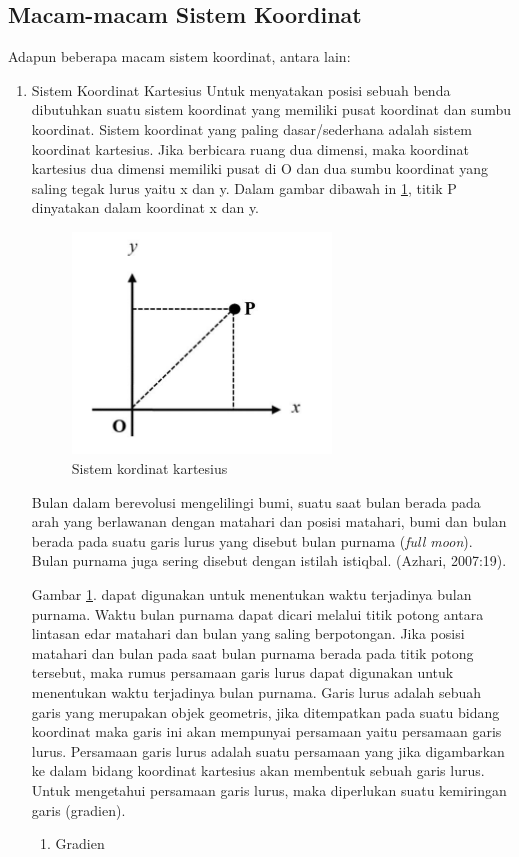 \subsection{Macam-macam Sistem Koordinat}
Adapun beberapa macam sistem koordinat, antara lain:
\begin{enumerate}
\item Sistem Koordinat Kartesius
Untuk menyatakan posisi sebuah benda dibutuhkan suatu sistem koordinat yang memiliki pusat koordinat dan sumbu koordinat. Sistem koordinat yang paling dasar/sederhana adalah sistem koordinat kartesius. Jika berbicara ruang dua dimensi, maka koordinat kartesius dua dimensi memiliki pusat di O dan dua sumbu koordinat yang saling tegak lurus yaitu x dan y. Dalam gambar dibawah in \ref{kartesius}, titik P dinyatakan dalam koordinat x dan y.
\begin{figure}[ht]
	\centerline{\includegraphics[width=0.65\textwidth]{pictures/kordinatkartesius.jpg}}
	\caption{Sistem kordinat kartesius}
	\label{kartesius}
	\end{figure}
Bulan dalam berevolusi mengelilingi bumi, suatu saat bulan berada pada arah yang berlawanan dengan matahari dan posisi matahari, bumi dan bulan berada pada suatu garis lurus yang disebut bulan purnama (\textit {full moon}). Bulan purnama juga sering disebut dengan istilah istiqbal. (Azhari, 2007:19).

Gambar \ref{kartesius}. dapat digunakan untuk menentukan waktu terjadinya bulan purnama. Waktu bulan purnama dapat dicari melalui titik potong antara lintasan edar matahari dan bulan yang saling berpotongan. Jika posisi matahari dan bulan pada saat bulan purnama berada pada titik potong tersebut, maka rumus persamaan garis lurus dapat digunakan untuk menentukan waktu terjadinya bulan purnama. Garis lurus adalah sebuah garis yang merupakan objek geometris, jika ditempatkan pada suatu bidang koordinat maka garis ini akan mempunyai  persamaan yaitu persamaan garis lurus. Persamaan garis lurus adalah suatu persamaan yang jika digambarkan ke dalam bidang koordinat kartesius akan membentuk sebuah garis lurus. Untuk mengetahui persamaan garis lurus, maka diperlukan suatu kemiringan garis (gradien).
	\begin{enumerate}
	\item Gradien 


\end{enumerate}
\end{enumerate}
